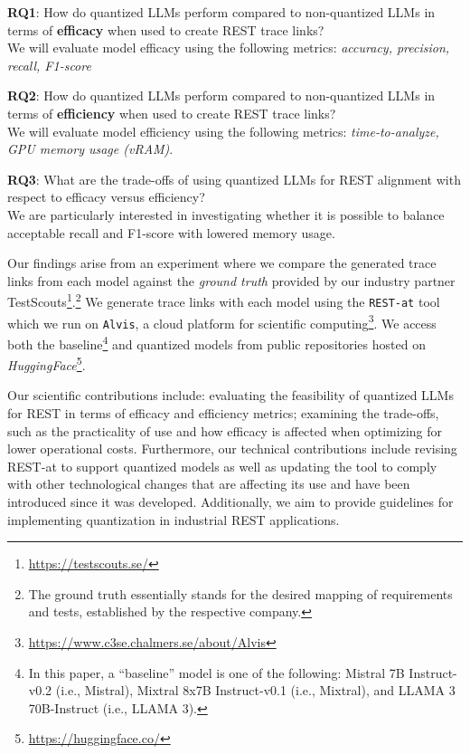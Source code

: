 \documentclass[conference]{IEEEtran}
\begin{document}
\begin{RQBox}
    \textbf{RQ1}: How do quantized LLMs perform compared to non-quantized LLMs
    in terms of \textbf{efficacy} when used to create REST trace links?\\[0.5em]
    We will evaluate model efficacy using the following metrics: \textit{accuracy, precision, recall, F1-score}
\end{RQBox}


\begin{RQBox}
    \textbf{RQ2}: How do quantized LLMs perform compared to non-quantized LLMs in
    terms of \textbf{efficiency} when used to create REST trace links? \\[0.5em]
    We will evaluate model efficiency using the following metrics: \textit{time-to-analyze, GPU memory usage (vRAM)}.
\end{RQBox}

\begin{RQBox}
    \textbf{RQ3}: What are the trade-offs of using quantized LLMs for REST alignment
    with respect to efficacy versus efficiency? \\[0.5em]
    We are particularly interested in investigating whether it is possible to balance acceptable recall and F1-score with lowered memory usage.
\end{RQBox}


\newcommand{\modelsFootnote}{In this paper, a ``baseline'' model is one of the following: Mistral 7B Instruct-v0.2 (i.e., Mistral), Mixtral 8x7B Instruct-v0.1 (i.e., Mixtral), and LLAMA 3 70B-Instruct (i.e., LLAMA 3).} 

Our findings arise from an experiment where we compare the generated trace links from each model against the \textit{ground truth} provided by our industry partner TestScouts\footnote{\url{https://testscouts.se/}}.\footnote{The ground truth essentially stands for the desired mapping of requirements and tests, established by the respective company.} We generate trace links with each model using the \verb|REST-at| tool which we run on \verb|Alvis|, a cloud platform for scientific computing\footnote{\url{https://www.c3se.chalmers.se/about/Alvis}}. We access both the baseline\footnote{\label{baselineModels}\modelsFootnote} and quantized models from public repositories hosted on \textit{HuggingFace}\footnote{\url{https://huggingface.co/}}.

Our scientific contributions include: evaluating the feasibility of quantized LLMs for REST in terms of efficacy and efficiency metrics; examining the trade-offs, such as the practicality of use and how efficacy is affected when optimizing for lower operational costs. Furthermore, our technical contributions include revising REST-at to support quantized models as well as updating the tool to comply with other technological changes that are affecting its use and have been introduced since it was developed. Additionally, we aim to provide guidelines for implementing quantization in industrial REST applications.
\end{document}
